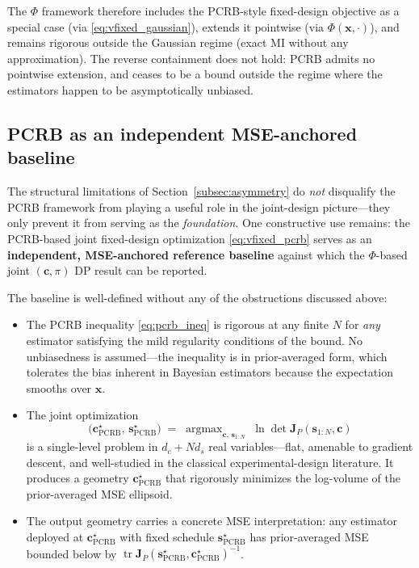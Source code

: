 \documentclass[11pt,a4paper]{article}
\newcommand{\tr}{\operatorname{tr}}
\newcommand{\argmax}{\operatorname{argmax}}
\begin{document}
The $\Phi$ framework therefore includes the PCRB-style fixed-design objective as a special case (via \eqref{eq:vfixed_gaussian}), extends it pointwise (via $\Phi(\bm{x}, \cdot)$), and remains rigorous outside the Gaussian regime (exact MI without any approximation).  The reverse containment does not hold: PCRB admits no pointwise extension, and ceases to be a bound outside the regime where the estimators happen to be asymptotically unbiased.

\subsection{PCRB as an independent MSE-anchored baseline}
\label{subsec:pcrb_baseline}

The structural limitations of Section~\ref{subsec:asymmetry} do \emph{not} disqualify the PCRB framework from playing a useful role in the joint-design picture---they only prevent it from serving as the \emph{foundation}.  One constructive use remains: the PCRB-based joint fixed-design optimization \eqref{eq:vfixed_pcrb} serves as an \textbf{independent, MSE-anchored reference baseline} against which the $\Phi$-based joint $(\bm{c}, \pi)$ DP result can be reported.

The baseline is well-defined without any of the obstructions discussed above:
\begin{itemize}[nosep, leftmargin=2em]
  \item The PCRB inequality \eqref{eq:pcrb_ineq} is rigorous at any finite $N$ for \emph{any} estimator satisfying the mild regularity conditions of the bound.  No unbiasedness is assumed---the inequality is in prior-averaged form, which tolerates the bias inherent in Bayesian estimators because the expectation smooths over $\bm{x}$.
  \item The joint optimization
  \begin{equation}
    \bigl(\bm{c}_{\mathrm{PCRB}}^\star,\, \bm{s}^\star_{\mathrm{PCRB}}\bigr) \;=\; \argmax_{\bm{c},\, \bm{s}_{1:N}}\; \ln\det \bm{J}_P(\bm{s}_{1:N}, \bm{c})
    \label{eq:pcrb_baseline}
  \end{equation}
  is a single-level problem in $d_c + N d_s$ real variables---flat, amenable to gradient descent, and well-studied in the classical experimental-design literature.  It produces a geometry $\bm{c}_{\mathrm{PCRB}}^\star$ that rigorously minimizes the log-volume of the prior-averaged MSE ellipsoid.
  \item The output geometry carries a concrete MSE interpretation: any estimator deployed at $\bm{c}_{\mathrm{PCRB}}^\star$ with fixed schedule $\bm{s}^\star_{\mathrm{PCRB}}$ has prior-averaged MSE bounded below by $\tr \bm{J}_P(\bm{s}^\star_{\mathrm{PCRB}}, \bm{c}_{\mathrm{PCRB}}^\star)^{-1}$.
\end{itemize}
\end{document}
